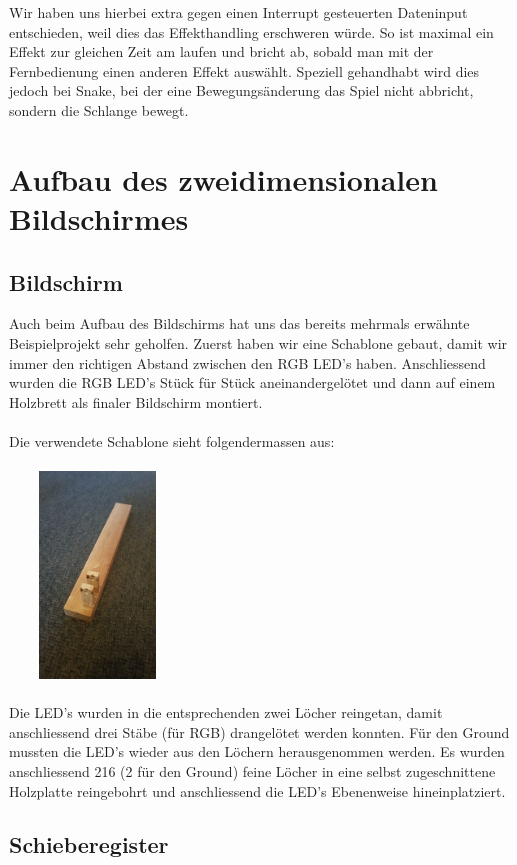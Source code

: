 \documentclass[12pt,a4paper]{article}
\begin{document}
Wir haben uns hierbei extra gegen einen Interrupt gesteuerten Dateninput entschieden, weil dies das Effekthandling erschweren würde. So ist maximal ein Effekt zur gleichen Zeit am laufen und bricht ab, sobald man mit der Fernbedienung einen anderen Effekt auswählt. Speziell gehandhabt wird dies jedoch bei Snake, bei der eine Bewegungsänderung das Spiel nicht abbricht, sondern die Schlange bewegt.
\newpage
\section{Aufbau des zweidimensionalen Bildschirmes}

\subsection{Bildschirm}

Auch beim Aufbau des Bildschirms hat uns das bereits mehrmals erwähnte Beispielprojekt sehr geholfen.
Zuerst haben wir eine Schablone gebaut, damit wir immer den richtigen Abstand zwischen den RGB LED's haben.
Anschliessend wurden die RGB LED's Stück für Stück aneinandergelötet und dann auf einem Holzbrett als finaler Bildschirm
montiert.\\\\
Die verwendete Schablone sieht folgendermassen aus: \\\\
\includegraphics[width=0.35\textwidth, height=5.5cm]{montagehilfe.jpg} \\\\
Die LED's wurden in die entsprechenden zwei Löcher reingetan, damit anschliessend drei Stäbe (für RGB) drangelötet werden konnten.
Für den Ground mussten die LED's wieder aus den Löchern herausgenommen werden. Es wurden anschliessend 216 (2 für den Ground) feine Löcher in eine selbst
zugeschnittene Holzplatte reingebohrt und anschliessend die LED's Ebenenweise hineinplatziert.

\subsection{Schieberegister}
\end{document}
